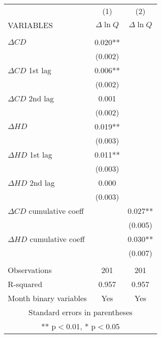 \begin{tabular}{lcc} \hline
 & (1) & (2) \\
VARIABLES & $\Delta \ln Q$ & $\Delta \ln Q$ \\ \hline
 &  &  \\
$\Delta CD$ & 0.020** &  \\
 & (0.002) &  \\
$\Delta CD$ 1st lag & 0.006** &  \\
 & (0.002) &  \\
$\Delta CD$ 2nd lag & 0.001 &  \\
 & (0.002) &  \\
$\Delta HD$ & 0.019** &  \\
 & (0.003) &  \\
$\Delta HD$ 1st lag & 0.011** &  \\
 & (0.003) &  \\
$\Delta HD$ 2nd lag & 0.000 &  \\
 & (0.003) &  \\
$\Delta CD$ cumulative coeff &  & 0.027** \\
 &  & (0.005) \\
$\Delta HD$ cumulative coeff &  & 0.030** \\
 &  & (0.007) \\
 &  &  \\
Observations & 201 & 201 \\
R-squared & 0.957 & 0.957 \\
 Month binary variables & Yes & Yes \\ \hline
\multicolumn{3}{c}{ Standard errors in parentheses} \\
\multicolumn{3}{c}{ ** p$<$0.01, * p$<$0.05} \\
\end{tabular}
